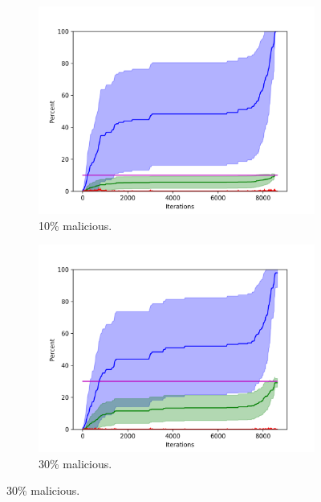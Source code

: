 \begin{figure}
\begin{subfigure}{0.45\textwidth}
\includegraphics[width=\linewidth]{images/plots/Network_rA/10_10.png}
\caption{10\% malicious.}
\end{subfigure}
\hspace*{0.1cm} %
\begin{subfigure}{0.45\textwidth}
\includegraphics[width=\linewidth]{images/plots/Network_rA/10_30.png}
\caption{30\% malicious.}
\end{subfigure}

\vspace{1cm}


\end{figure}
